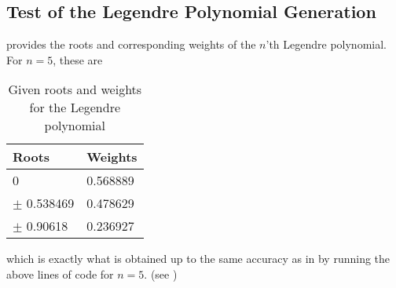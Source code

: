 \subsection{Test of the Legendre Polynomial Generation}
 provides the roots and corresponding weights of the $n$'th Legendre polynomial.
\cite{LegendrePolRootWeight} 
For $n=5$, these are 
\begin{table}[H]
\centering
\caption{Given roots and weights for the Legendre polynomial}
\begin{center}
\begin{tabular}{ | l | l | }
  \hline			
  Roots & Weights  \\
  \hline
  0 & 0.568889  \\
  \hline
  $\pm$ 0.538469 & 0.478629  \\
  \hline 
  $\pm$ 0.90618 & 0.236927 \\
  \hline 
\end{tabular}
\end{center}
\label{tab:testGLdpol}
\end{table}

which is exactly what is obtained up to the same accuracy as in  by running the above lines of code for $n=5$. (see )